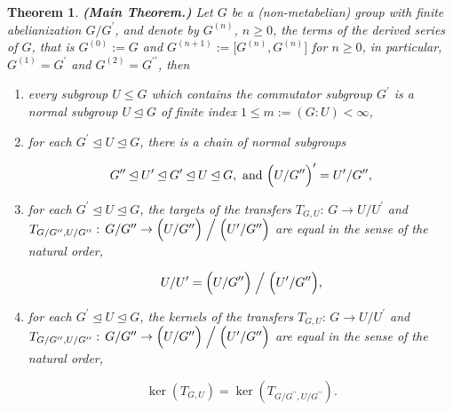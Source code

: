 \documentclass{amsart}
\newtheorem{theorem}{Theorem}[section]
\theoremstyle{definition}
\numberwithin{equation}{section}
\begin{document}
\begin{theorem}
\label{thm:DrvSer}
\textbf{(Main Theorem.)}
Let \(G\) be a (non-metabelian) group with finite abelianization \(G/G^\prime\),
and denote by \(G^{(n)}\), \(n\ge 0\), the terms of the derived series of \(G\),
that is \(G^{(0)}:=G\) and \(G^{(n+1)}:=\lbrack G^{(n)},G^{(n)}\rbrack\) for \(n\ge 0\),
in particular, \(G^{(1)}=G^\prime\) and \(G^{(2)}=G^{\prime\prime}\),
then

\begin{enumerate}

\item
every subgroup \(U\le G\) which contains the commutator subgroup \(G^\prime\)
is a normal subgroup \(U\unlhd G\) of finite index \(1\le m:=(G:U)<\infty\),

\item
for each \(G^\prime\unlhd U\unlhd G\),
there is a chain of normal subgroups

\begin{equation}
\label{eqn:InclChain}
G^{\prime\prime}\unlhd U^\prime\unlhd G^\prime\unlhd U\unlhd G,
\text{ and } \Bigl(U/G^{\prime\prime}\Bigr)^\prime=U^\prime/G^{\prime\prime},
\end{equation}

\item
for each \(G^\prime\unlhd U\unlhd G\),
the targets of the transfers
\(T_{G,U}:\,G\to U/U^\prime\) and\\
\(T_{G/G^{\prime\prime},U/G^{\prime\prime}}:\,
G/G^{\prime\prime}\to\Bigl(U/G^{\prime\prime}\Bigr)\Bigm/\Bigl(U^\prime/G^{\prime\prime}\Bigr)\)
are equal in the sense of the natural order,

\begin{equation}
\label{eqn:Tau}
U/U^\prime=\Bigl(U/G^{\prime\prime}\Bigr)\Bigm/\Bigl(U^\prime/G^{\prime\prime}\Bigr),
\end{equation}

\item
for each \(G^\prime\unlhd U\unlhd G\),
the kernels of the transfers
\(T_{G,U}:\,G\to U/U^\prime\) and\\
\(T_{G/G^{\prime\prime},U/G^{\prime\prime}}:\,
G/G^{\prime\prime}\to\Bigl(U/G^{\prime\prime}\Bigr)\Bigm/\Bigl(U^\prime/G^{\prime\prime}\Bigr)\)
are equal in the sense of the natural order,

\begin{equation}
\label{eqn:Kappa}
\ker(T_{G,U})=\ker(T_{G/G^{\prime\prime},U/G^{\prime\prime}}).
\end{equation}

\end{enumerate}

\end{theorem}
\end{document}
